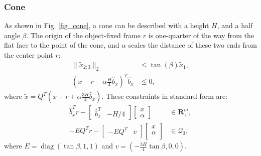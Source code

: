 \subsubsection{Cone}
As shown in Fig. \ref{fig_cone}, a cone can be described with a height $H$, and a half angle $\beta$. The origin of the object-fixed frame $r$ is one-quarter of the way from the flat face to the point of the cone, and $\alpha$ scales the distance of these two ends from the center point $r$:
\begin{align}
    \|\tilde{x}_{2:3}\|_2 &\leq \tan(\beta) \tilde{x}_1, \\ 
    (x - r - \alpha \frac{H}{4} \hat{b}_x)^T \hat{b}_x &\leq 0 ,
\end{align}
where $\tilde{x} = Q^T  (x - r + \alpha \frac{3H}{4} \hat{b}_x)$.  These constraints in standard form are:
\begin{align}
    \hat{b}_x^Tr - \begin{bmatrix} \hat{b}_x^T  & -H/4  \end{bmatrix} \begin{bmatrix} x \\ \alpha \end{bmatrix} &\in \mathbf{R}_+^m, \\ 
    -EQ^Tr  - \begin{bmatrix} -EQ^T & v \end{bmatrix} \begin{bmatrix} x \\ \alpha \\  \end{bmatrix} &\in \mathcal{Q}_3,
\end{align}
where $E = \operatorname{diag}(\tan \beta,1,1)$ and $v = (-\frac{3H}{4} \tan \beta,0,0)$.
